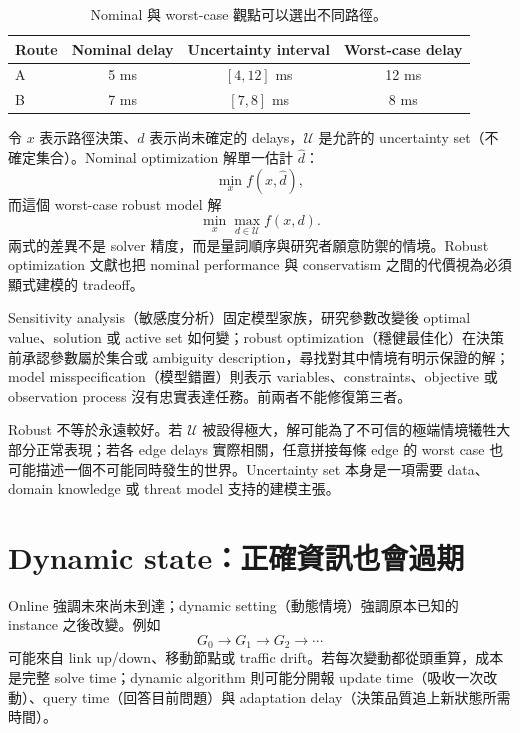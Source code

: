 \documentclass[11pt,a4paper,oneside,openany]{book}
\begin{document}
\begin{table}[htbp]
\centering
\caption{Nominal 與 worst-case 觀點可以選出不同路徑。}
\begin{tabular}{@{}lccc@{}}
\toprule
Route & Nominal delay & Uncertainty interval & Worst-case delay \\
\midrule
A & 5 ms & $[4,12]$ ms & 12 ms \\
B & 7 ms & $[7,8]$ ms & 8 ms \\
\bottomrule
\end{tabular}
\label{tab:robust-routes}
\end{table}

令 $x$ 表示路徑決策、$d$ 表示尚未確定的 delays，$\mathcal U$ 是允許的 uncertainty set（不確定集合）。Nominal optimization 解單一估計 $\widehat d$：
\[
 \min_x f(x,\widehat d),
\]
而這個 worst-case robust model 解
\[
 \min_x\max_{d\in\mathcal U} f(x,d).
\]
兩式的差異不是 solver 精度，而是量詞順序與研究者願意防禦的情境。Robust optimization 文獻也把 nominal performance 與 conservatism 之間的代價視為必須顯式建模的 tradeoff\cite{bertsimas-sim}。

\begin{definition}
Sensitivity analysis（敏感度分析）固定模型家族，研究參數改變後 optimal value、solution 或 active set 如何變；robust optimization（穩健最佳化）在決策前承認參數屬於集合或 ambiguity description，尋找對其中情境有明示保證的解；model misspecification（模型錯置）則表示 variables、constraints、objective 或 observation process 沒有忠實表達任務。前兩者不能修復第三者。
\end{definition}

Robust 不等於永遠較好。若 $\mathcal U$ 被設得極大，解可能為了不可信的極端情境犧牲大部分正常表現；若各 edge delays 實際相關，任意拼接每條 edge 的 worst case 也可能描述一個不可能同時發生的世界。Uncertainty set 本身是一項需要 data、domain knowledge 或 threat model 支持的建模主張。

\section{Dynamic state：正確資訊也會過期}

Online 強調未來尚未到達；dynamic setting（動態情境）強調原本已知的 instance 之後改變。例如
\[
 G_0\longrightarrow G_1\longrightarrow G_2\longrightarrow\cdots
\]
可能來自 link up/down、移動節點或 traffic drift。若每次變動都從頭重算，成本是完整 solve time；dynamic algorithm 則可能分開報 update time（吸收一次改動）、query time（回答目前問題）與 adaptation delay（決策品質追上新狀態所需時間）。
\end{document}
